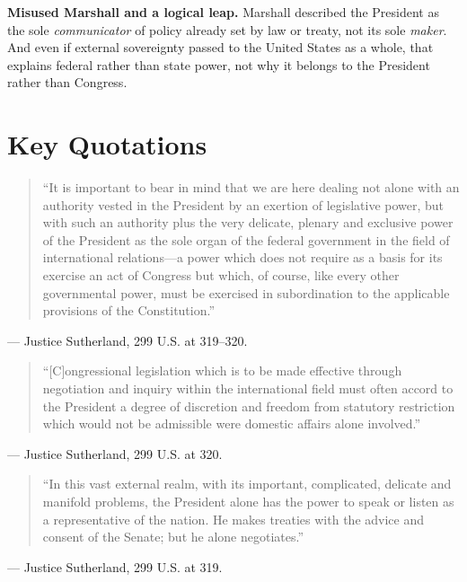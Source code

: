 \documentclass[12pt]{article}
\begin{document}
\textbf{Misused Marshall and a logical leap.} Marshall described the President as the sole \textit{communicator} of policy already set by law or treaty, not its sole \textit{maker}. And even if external sovereignty passed to the United States as a whole, that explains federal rather than state power, not why it belongs to the President rather than Congress.

\section{Key Quotations}

\begin{quote}
``It is important to bear in mind that we are here dealing not alone with an authority vested in the President by an exertion of legislative power, but with such an authority plus the very delicate, plenary and exclusive power of the President as the sole organ of the federal government in the field of international relations---a power which does not require as a basis for its exercise an act of Congress but which, of course, like every other governmental power, must be exercised in subordination to the applicable provisions of the Constitution.''
\end{quote}
\noindent --- Justice Sutherland, 299 U.S. at 319--320.

\begin{quote}
``[C]ongressional legislation which is to be made effective through negotiation and inquiry within the international field must often accord to the President a degree of discretion and freedom from statutory restriction which would not be admissible were domestic affairs alone involved.''
\end{quote}
\noindent --- Justice Sutherland, 299 U.S. at 320.

\begin{quote}
``In this vast external realm, with its important, complicated, delicate and manifold problems, the President alone has the power to speak or listen as a representative of the nation. He makes treaties with the advice and consent of the Senate; but he alone negotiates.''
\end{quote}
\noindent --- Justice Sutherland, 299 U.S. at 319.
\end{document}
